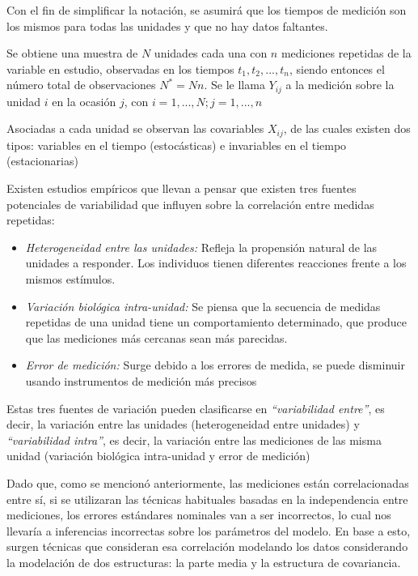 \documentclass[spanish]{article}
\numberwithin{figure}{subsection}
\numberwithin{equation}{subsection}
\numberwithin{table}{subsection}
\begin{document}
Con el fin de simplificar la notación, se asumirá que los tiempos de medición
son los mismos para todas las unidades y que no hay datos faltantes.

Se obtiene una muestra de $N$ unidades cada una con $n$ mediciones repetidas de
la variable en estudio, observadas en los tiempos $t_1, t_2, ..., t_n$, siendo
entonces el número total de observaciones $N^*=Nn$. Se le llama $Y_{ij}$ a la
medición sobre la unidad $i$ en la ocasión $j$, con $i=1, ..., N; j=1, ..., n$

Asociadas a cada unidad se observan las covariables $X_{ij}$, de las cuales
existen dos tipos: variables en el tiempo (estocásticas) e invariables en el
tiempo (estacionarias)

Existen estudios empíricos que llevan a pensar que existen tres fuentes
potenciales de variabilidad que influyen sobre la correlación entre medidas
repetidas:

\begin{itemize}
	\item \textit{Heterogeneidad entre las unidades:} Refleja la propensión
	natural de las unidades a responder. Los individuos tienen diferentes
	reacciones frente a los mismos estímulos.
	\item \textit{Variación biológica intra-unidad:} Se piensa que la secuencia
	de medidas repetidas de una unidad tiene un comportamiento determinado, que
	produce que las mediciones más cercanas sean más parecidas.
	\item \textit{Error de medición:} Surge debido a los errores de medida, se
	puede disminuir usando instrumentos de medición más precisos
\end{itemize}

Estas tres fuentes de variación pueden clasificarse en \textit{``variabilidad
entre''}, es decir, la variación entre las unidades (heterogeneidad entre
unidades) y \textit{``variabilidad intra''}, es decir, la variación entre las
mediciones de las misma unidad (variación biológica intra-unidad y error de
medición)

Dado que, como se mencionó anteriormente, las mediciones están correlacionadas
entre sí, si se utilizaran las técnicas habituales basadas en la independencia
entre mediciones, los errores estándares nominales van a ser incorrectos, lo
cual nos llevaría a inferencias incorrectas sobre los parámetros del modelo. En
base a esto, surgen técnicas que consideran esa correlación modelando los datos
considerando la modelación de dos estructuras: la parte media y la estructura
de covariancia.
\end{document}
